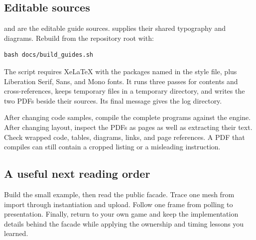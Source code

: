 \documentclass[11pt,a4paper]{article}
\begin{document}
\subsection*{Editable sources}
 and  are the editable guide sources.  supplies their shared typography and diagrams. Rebuild from the repository root with:
\begin{lstlisting}[language={}]
bash docs/build_guides.sh
\end{lstlisting}
The script requires XeLaTeX with the packages named in the style file, plus Liberation Serif, Sans, and Mono fonts. It runs three passes for contents and cross-references, keeps temporary files in a temporary directory, and writes the two PDFs beside their sources. Its final message gives the log directory.

After changing code samples, compile the complete programs against the engine. After changing layout, inspect the PDFs as pages as well as extracting their text. Check wrapped code, tables, diagrams, links, and page references. A PDF that compiles can still contain a cropped listing or a misleading instruction.

\subsection*{A useful next reading order}
Build the small example, then read the public facade. Trace one mesh from import through instantiation and upload. Follow one frame from polling to presentation. Finally, return to your own game and keep the implementation details behind the facade while applying the ownership and timing lessons you learned.
\end{document}
